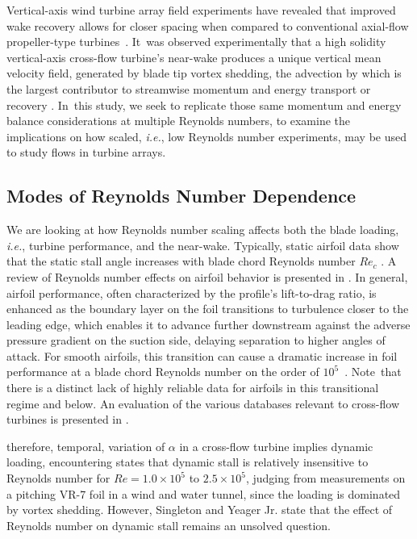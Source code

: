 \documentclass[energies,article,accept,moreauthors,pdftex,10pt,a4paper]{mdpi}
\theoremstyle{mdpi}
\newcounter{ex}
\newcounter{re}
\begin{document}
Vertical-axis wind turbine array field experiments have revealed that improved
wake recovery allows for closer spacing when compared to conventional axial-flow
propeller-type \mbox{turbines \cite{Dabiri2011, Kinzel2012}}. It~was observed
experimentally that a high solidity vertical-axis cross-flow turbine's near-wake
produces a unique vertical mean velocity field, generated by blade tip vortex
shedding, the advection by which is the largest contributor to streamwise
momentum and energy transport or recovery \cite{Bachant2015-JoT}. In~this study,
we seek to replicate those same momentum and energy balance considerations at
multiple Reynolds numbers, to examine the implications on how scaled, \emph{i.e.}, low
Reynolds number experiments, may be used to study flows in turbine arrays.


\subsection{Modes of Reynolds Number Dependence}

We are looking at how Reynolds number scaling affects both the blade loading,
\emph{i.e.}, turbine performance, and the near-wake. Typically, static airfoil data
show that the static stall angle increases with blade chord Reynolds number
$Re_c$ \cite{Jacobs1937}. A review of Reynolds number effects on airfoil
behavior is presented in \cite{Lissaman1983}. In general, airfoil
performance, often characterized by the profile's lift-to-drag ratio, is
enhanced as the boundary layer on the foil transitions to turbulence closer to
the leading edge, which enables it to advance further downstream against the
adverse pressure gradient on the suction side, delaying separation to higher
angles of attack. For smooth airfoils, this transition can cause a dramatic
increase in foil performance at a blade chord Reynolds number on the order of
\mbox{$10^5$ \cite{McMasters1980}}. Note~that there is a distinct lack of highly
reliable data for airfoils in this transitional regime and below. An evaluation
of the various databases relevant to cross-flow turbines is presented in
\cite{Bedon2014}.

 therefore, temporal, variation of $\alpha$ in a cross-flow
turbine implies dynamic loading, encountering  states that dynamic stall is relatively
insensitive to Reynolds number for $Re=1.0 \times 10^5$ to $2.5 \times
10^5$, judging from measurements on a pitching VR-7 foil in a wind and water
tunnel, since the loading is dominated by vortex shedding. However, Singleton
and Yeager Jr. \cite{Singleton2000} state that the effect of Reynolds number on
dynamic stall remains an unsolved question.
\end{document}
